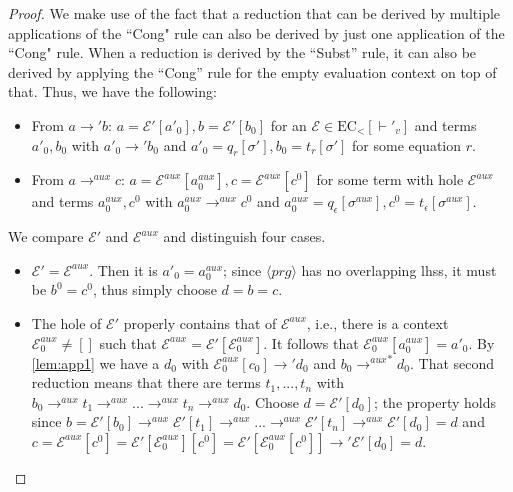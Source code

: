 \cdpaux*
\begin{proof}
We make use of the fact that a reduction that can be derived by multiple applications of the ``Cong" rule can also be derived by just one application of the ``Cong" rule. When a reduction is derived by the ``Subst'' rule, it can also be derived by applying the ``Cong'' rule for the empty evaluation context on top of that. Thus, we have the following:
\begin{itemize}
\item From $a \longrightarrow' b$: $a = \mathcal{E}'[a'_0], b = \mathcal{E}'[b_0]$ for an $\mathcal{E} \in \textrm{EC}_<[\vdash'_v]$ and terms $a'_0, b_0$ with $a'_0 \longrightarrow' b_0$ and $a'_0 = q_r[\sigma'], b_0 = t_r[\sigma']$ for some equation $r$.

\item From $a \longrightarrow^{aux} c$: $a = \mathcal{E}^{aux}[a^{aux}_0], c = \mathcal{E}^{aux}[c^0]$ for some term with hole $\mathcal{E}^{aux}$ and terms $a^{aux}_0, c^0$ with $a^{aux}_0 \longrightarrow^{aux} c^0$ and $a^{aux}_0 = q_\epsilon[\sigma^{aux}], c^0 = t_\epsilon[\sigma^{aux}]$.
\end{itemize}

We compare $\mathcal{E}'$ and $\mathcal{E}^{aux}$ and distinguish four cases.
\begin{itemize}
\item $\mathcal{E}' = \mathcal{E}^{aux}$. Then it is $a'_0 = a^{aux}_0$; since $\langle prg \rangle$ has no overlapping lhss, it must be $b^0 = c^0$, thus simply choose $d = b = c$.

\item The hole of $\mathcal{E}'$ properly contains that of $\mathcal{E}^{aux}$, i.e., there is a context $\mathcal{E}^{aux}_0 \neq []$ such that $\mathcal{E}^{aux} = \mathcal{E}'[\mathcal{E}^{aux}_0]$. It follows that $\mathcal{E}^{aux}_0[a^{aux}_0] = a'_0$. By \autoref{lem:app1} we have a $d_0$ with $\mathcal{E}^{aux}_0[c_0] \longrightarrow' d_0$ and $b_0 {\longrightarrow^{aux}}^* d_0$. That second reduction means that there are terms $t_1, ..., t_n$ with $b_0 \longrightarrow^{aux} t_1 \longrightarrow^{aux} ... \longrightarrow^{aux} t_n \longrightarrow^{aux} d_0$. Choose $d = \mathcal{E}'[d_0]$; the property holds since $b = \mathcal{E}'[b_0] \longrightarrow^{aux} \mathcal{E}'[t_1] \longrightarrow^{aux} ... \longrightarrow^{aux} \mathcal{E}'[t_n] \longrightarrow^{aux} \mathcal{E}'[d_0] = d$ and $c = \mathcal{E}^{aux}[c^0] = \mathcal{E}'[\mathcal{E}^{aux}_0][c^0] = \mathcal{E}'[\mathcal{E}^{aux}_0[c^0]] \longrightarrow' \mathcal{E}'[d_0] = d$.


\end{itemize}
\end{proof}
